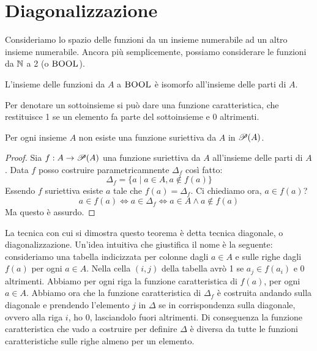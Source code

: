 \section{Diagonalizzazione}

Consideriamo lo spazio delle funzioni da un insieme numerabile ad un altro insieme numerabile.
Ancora più semplicemente, possiamo considerare le funzioni da $\mathbb{N}$ a 2 (o $\bm{\textsc{BOOL}}$).

L'insieme delle funzioni da $A$ a $\bm{\textsc{BOOL}}$ è isomorfo all'insieme delle parti di $A$.

Per denotare un sottoinsieme si può dare una funzione caratteristica, che restituisce 1 se un
elemento fa parte del sottoinsieme e 0 altrimenti.

\begin{thm}
    Per ogni insieme $A$ non esiste una funzione suriettiva da $A$ in $\mathscr{P}(A)$.
\end{thm}
\begin{proof}
    Sia $f : A \to \mathscr{P}(A)$ una funzione suriettiva da $A$ all'insieme delle parti di $A$. Data
    $f$ posso costruire parametricamnente $\Delta_{f}$ così fatto:
    \begin{equation*}
        \Delta_{f} = \{a \mid a \in A, a \notin f(a)\}
    \end{equation*}
    Essendo $f$ suriettiva esiste $a$ tale che $f(a) = \Delta_{f}$. Ci chiediamo ora, $a \in f(a)$?
    \begin{equation*}
        a \in f(a) \iff a \in \Delta_{f} \iff a \in A \land a \notin f(a)
    \end{equation*}
    Ma questo è assurdo.
\end{proof}

La tecnica con cui si dimostra questo teorema è detta tecnica diagonale, o diagonalizzazione.
Un'idea intuitiva che giustifica il nome è la seguente: consideriamo una tabella indicizzata per
colonne dagli $a \in A$ e sulle righe dagli $f(a)$ per ogni $a \in A$. Nella cella $(i,j)$ della
tabella avrò 1 se $a_{j} \in f(a_{i})$ e 0 altrimenti. Abbiamo per ogni riga la funzione
caratteristica di $f(a)$, per ogni $a \in A$. Abbiamo ora che la funzione caratteristica di
$\Delta_{f}$ è costruita andando sulla diagonale e prendendo l'elemento $j$ in $\Delta$ se in
corrispondenza sulla diagonale, ovvero alla riga $i$, ho 0, lasciandolo fuori altrimenti. Di
conseguenza la funzione caratteristica che vado a costruire per definire $\Delta$ è diversa da
tutte le funzioni caratteristiche sulle righe almeno per un elemento.

